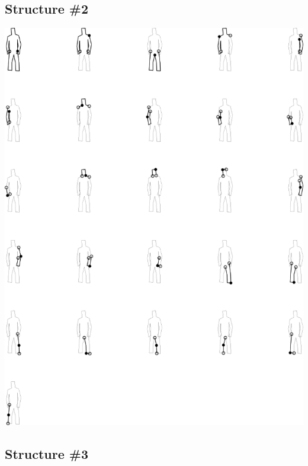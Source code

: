 \subsection{Structure \#2}

\includegraphics[width=6in]{output/3.learning/learning_setup/learning_setup_sdf1_.png}
\subsection{Structure \#3}

